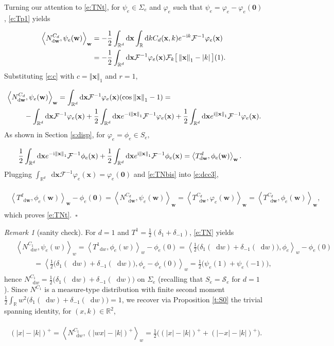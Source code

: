 \documentclass[11pt,A4,twoside]{article}
\numberwithin{equation}{section}
\newcommand{\F}{\mathcal{F}}
\newcommand{\Fi}{\mathcal{F}^{-1}}
\renewcommand*\d{\mathop{}\!\mathrm{d}}
\newcommand{\norml}[1]{\left\Vert#1 \right\Vert_{1}}
\newcommand{\norm}[1]{\left|#1 \right|}
\newcommand{\inner}[1]{\left\langle#1 \right\rangle}
\newcommand{\x}{\mathbf{x}}
\newcommand{\w}{\mathbf{w}}
\newcommand{\R}{\mathbbm{R}}
\renewcommand{\S}{\mathcal{S}}
\newcommand{\M}{\Sigma}
\newcommand{\intRd}{\int_{\R^d}}
\newcommand{\intRs}{\int_{\R }}
\newcommand{\intR}{\int_{\R}}
\def\qqq{\;\;\;\;\;\;\;\;\;}
\def\bel{\begin{eqnarray*}\begin{aligned}}
\def\eel{\end{aligned}\end{eqnarray*}}
\newcommand{\beqa}{\begin{eqnarray}}
\newcommand{\eeqa}{\end{eqnarray}}
\def\bal{\begin{aligned}}
\def\eal{\end{aligned}}
\def\bll#1{
\beqa\label{#1}\bal
}\def\lel{\eal\eeqa}
\newcommand{\beql}[1]{\bll{#1}}
\newcommand{\eeql}{\lel}
\theoremstyle{definition}
\theoremstyle{remark}
\newtheorem{remark}{Remark}[section]
\def\R{\mathbb{R}}
\def\varphie{\varphi_e}
\def\finproof {$\Box$ \vskip 5 pt }\def\finproof{\rule{4pt}{6pt}}\def\finproof{\ensuremath{\square}}
\def\thermi{{\rm i}}%
\begin{document}
Turning our attention to \eqref{e:TNt}, for $\psi_e\in \M_e$ and $\varphie $ such that  $\psi_e = \varphie  -  \varphie (\mathbf 0) $, \eqref{e:Tp1} yields
\beql{e:dc_span}
    \inner{N^{C_d}_{\d \w}, \psi_e(\w)}_{\w}
    & = -\frac{1}{2}\intRd \d\x\intRs \d k C_d (\x,k) e^{-\thermi k} \Fi \varphie (\x)\\
    &= -\frac{1}{2}\intRd \d\x\Fi \varphie (\x)\F_{k}\big[ \norml\x - \norm k\big](1).
\eeql
Substituting \eqref{e:c} with $c=\norml\x$ and $r=1$,
\beql{e:dcc3}
    & \inner{N^{C_d}_{\d \w}, \psi_e(\w)}_{\w}
    = \intRd \d\x\Fi \varphie (\x) (\cos\norml\x - 1)=
    \\
     &\qqq -\int_{\R^d} \d \x\Fi \varphie (\x) +  \frac{1}{2}  \intRd \d\x  e^{-\thermi  \norml{\x}} \Fi \varphie (\x)
    +  \frac{1}{2}  \intRd \d\x  e^{ \thermi  \norml{\x}} \Fi \varphie (\x).
\eeql
As shown in Section \ref{s:disp}, for $\varphie=\phi_e \in S_e,$
\beql{e:TNbis}
&\frac{1}{2}  \intRd \d\x  e^{-\thermi  \norml{\x}} \Fi \phi_e (\x)+  \frac{1}{2}  \intRd \d\x  e^{ \thermi  \norml{\x}} \Fi \phi_e (\x)=
  \inner{T^d_{\d \w},\phi_e (\w)}_{\w}.
\eeql 
Plugging $\int_{\R^d} \d \x\Fi \varphie (\x) =\varphie (\mathbf{0}) $ and
  \eqref{e:TNbis}
into \eqref{e:dcc3},
\beql{e:TN}
 \inner{T^d_{\d \w},\phi_e(\w)}_{\w}-\phi_e(\mathbf{0}) =\inner{N^{C_d}_{\d \w}, \psi_e(\w)}_{\w}
  =  \inner{T^{C_d}_{\d \w},\varphi_e(\w)}_{\w}=\inner{T^{C_d}_{\d \w},\phi_e(\w)}_{\w},
\eeql
which proves \eqref{e:TNt}.\ \finproof 


\begin{remark}[sanity check]\label{ex:expldisp}
    For $d=1$ and $T^1 = \frac12(\delta_1 + \delta_{-1})$, \eqref{e:TN} yields
    \bel
   & \inner{N^{C_1}_{\d w}, \psi_e(w)}_{w}  
   =   \inner{T^1_{\d w},\phi_e (w)}_{w} -\phi_e (0)   = \inner{\frac12\big(\delta_1(\d w) + \delta_{-1}(\d w)\big),\phi_e  }_{w} -\phi_e (0)\\&\qqq
   =\inner{\frac12\big(\delta_1(\d w) + \delta_{-1}(\d w)\big),\phi_e -\phi_e (0) }_{w}= \frac12\big(\psi_e(1) + \psi_e(-1)\big) , \eel 
   hence $N^{C_1}_{\d w}=\frac12\big(\delta_1(\d w) + \delta_{-1}(\d w)\big) $
    on $\M_e$ (recalling that $S_e=\S_e$ for $d=1$).  
    Since $N^{C_1}$ is a measure-type distribution with finite second moment $ \frac12\intR w^2 \big(\delta_1(\d w) + \delta_{-1}(\d w)\big) = 1$, we recover via Proposition \ref{t:S0} the trivial spanning identity, for $(x,k) \in \R^2$,
 \beql{EQ:PROP31}
    (|x|-|k|)^+  = \inner{N^{C_1}_{\d w}, (|wx|-|k|)^+}_{w}
    = \frac{1}{2} \big((|x|-|k|)^+ + (|-x|-|k|)^+ \big).
\eeql 
\end{remark}
\end{document}

